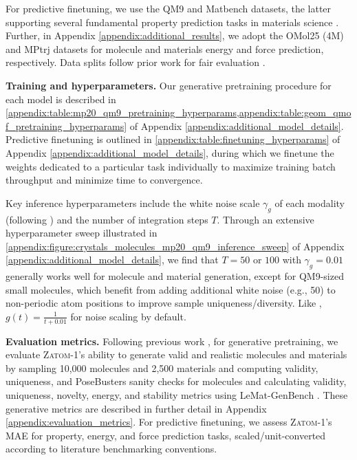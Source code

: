 \documentclass{article}
\theoremstyle{plain}
\theoremstyle{definition}
\theoremstyle{remark}
\begin{document}
For predictive finetuning, we use the QM9 and Matbench datasets, the latter supporting several fundamental property prediction tasks in materials science \citep{dunn2020benchmarking}. Further, in Appendix \ref{appendix:additional_results}, we adopt the OMol25 (4M) \citep{levine2025open} and MPtrj \citep{deng2023chgnet} datasets for molecule and materials energy and force prediction, respectively. Data splits follow prior work for fair evaluation \citep{liao2023equiformer, dunn2020benchmarking, levine2025open, deng2023chgnet}.

\textbf{Training and hyperparameters.} Our generative pretraining procedure for each model is described in \cref{appendix:table:mp20_qm9_pretraining_hyperparams,appendix:table:geom_qmof_pretraining_hyperparams} of Appendix \ref{appendix:additional_model_details}. Predictive finetuning is outlined in \cref{appendix:table:finetuning_hyperparams} of Appendix \ref{appendix:additional_model_details}, during which we finetune the weights dedicated to a particular task individually to maximize training batch throughput and minimize time to convergence.

Key inference hyperparameters include the white noise scale $\gamma_g$ of each modality (following \citet{geffner2025proteina}) and the number of integration steps $T$. Through an extensive hyperparameter sweep illustrated in \cref{appendix:figure:crystals_molecules_mp20_qm9_inference_sweep} of Appendix \ref{appendix:additional_model_details}, we find that $T=50$ or $100$ with $\gamma_g = 0.01$ generally works well for molecule and material generation, except for QM9-sized small molecules, which benefit from adding additional white noise (e.g., 50) to non-periodic atom positions to improve sample uniqueness/diversity. Like \citet{vonessen2025tabasco}, $g(t) = \frac{1}{t+0.01}$ for noise scaling by default.

\textbf{Evaluation metrics.} Following previous work \citep{hoogeboom2022equivariant, joshi2025allatom}, for generative pretraining, we evaluate \textsc{Zatom-1}'s ability to generate valid and realistic molecules and materials by sampling 10,000 molecules and 2,500 materials and computing validity, uniqueness, and PoseBusters sanity checks for molecules \citep{buttenschoen2024posebusters} and calculating validity, uniqueness, novelty, energy, and stability metrics using LeMat-GenBench \citep{duval2025lemat}. These generative metrics are described in further detail in Appendix \ref{appendix:evaluation_metrics}. For predictive finetuning, we assess \textsc{Zatom-1}'s MAE for property, energy, and force prediction tasks, scaled/unit-converted according to literature benchmarking conventions.
\end{document}
